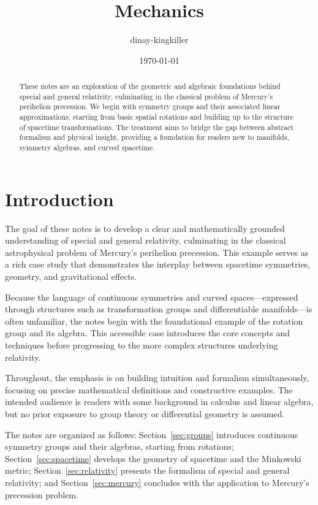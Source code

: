 \documentclass{amsart}
\theoremstyle{remark}
\begin{document}
\title{Mechanics}
\author{dinay-kingkiller}
\date{\today}

\begin{abstract}
  These notes are an exploration of the geometric and algebraic foundations behind special and general relativity, culminating in the classical problem of Mercury’s perihelion precession. We begin with symmetry groups and their associated linear approximations, starting from basic spatial rotations and building up to the structure of spacetime transformations. The treatment aims to bridge the gap between abstract formalism and physical insight, providing a foundation for readers new to manifolds, symmetry algebras, and curved spacetime.
\end{abstract}

\maketitle

\section{Introduction}

The goal of these notes is to develop a clear and mathematically grounded understanding of special and general relativity, culminating in the classical astrophysical problem of Mercury’s perihelion precession. This example serves as a rich case study that demonstrates the interplay between spacetime symmetries, geometry, and gravitational effects.

Because the language of continuous symmetries and curved spaces—expressed through structures such as transformation groups and differentiable manifolds—is often unfamiliar, the notes begin with the foundational example of the rotation group and its algebra. This accessible case introduces the core concepts and techniques before progressing to the more complex structures underlying relativity.

Throughout, the emphasis is on building intuition and formalism simultaneously, focusing on precise mathematical definitions and constructive examples. The intended audience is readers with some background in calculus and linear algebra, but no prior exposure to group theory or differential geometry is assumed.

The notes are organized as follows: Section~\ref{sec:groups} introduces continuous symmetry groups and their algebras, starting from rotations; Section~\ref{sec:spacetime} develops the geometry of spacetime and the Minkowski metric; Section~\ref{sec:relativity} presents the formalism of special and general relativity; and Section~\ref{sec:mercury} concludes with the application to Mercury’s precession problem.
\end{document}
